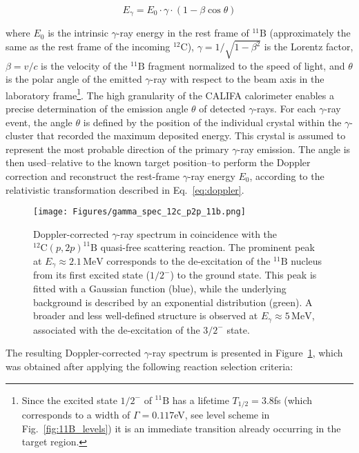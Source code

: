 \begin{equation}
    E_\gamma = E_0 \cdot \gamma \cdot (1 - \beta \cos \theta)
	\label{eq:doppler}
\end{equation}

where $E_0$ is the intrinsic $\gamma$-ray energy in the rest frame of $^{11}\mathrm{B}$ (approximately the same as the rest frame of the incoming $^{12}\mathrm{C}$), $\gamma = 1/\sqrt{1 - \beta^2}$ is the Lorentz factor, $\beta = v/c$ is the velocity of the $^{11}\mathrm{B}$ fragment normalized to the speed of light, and $\theta$ is the polar angle of the emitted $\gamma$-ray with respect to the beam axis in the laboratory frame\footnote{Since the excited state $1/2^-$ of $^{11}\mathrm{B}$ has a lifetime $T_{1/2} = 3.8$fs (which corresponds to a width of $\Gamma = 0.117$eV, see level scheme in Fig.~\ref{fig:11B_levels}) it is an immediate transition already occurring in the target region.}.\newline
The high granularity of the CALIFA calorimeter enables a precise determination of the emission angle $\theta$ of detected $\gamma$-rays. For each $\gamma$-ray event, the angle $\theta$ is defined by the position of the individual crystal within the $\gamma$-cluster that recorded the maximum deposited energy. This crystal is assumed to represent the most probable direction of the primary $\gamma$-ray emission. The angle is then used--relative to the known target position--to perform the Doppler correction and reconstruct the rest-frame $\gamma$-ray energy $E_0$, according to the relativistic transformation described in Eq.~\eqref{eq:doppler}.
\begin{figure}[htpb]
    \centering
    \texttt{[image: Figures/gamma\_spec\_12c\_p2p\_11b.png]}
    \caption{
Doppler-corrected $\gamma$-ray spectrum in coincidence with the $^{12}\mathrm{C}(p,2p)^{11}\mathrm{B}$ quasi-free scattering reaction. The prominent peak at $E_{\gamma} \approx 2.1\,\mathrm{MeV}$ corresponds to the de-excitation of the $^{11}\mathrm{B}$ nucleus from its first excited state ($1/2^-$) to the ground state. This peak is fitted with a Gaussian function (blue), while the underlying background is described by an exponential distribution (green). A broader and less well-defined structure is observed at $E_{\gamma} \approx 5\,\mathrm{MeV}$, associated with the de-excitation of the $3/2^-$ state.
    }
    \label{fig:gamma_spec_12c_p2p_11b}
\end{figure}
The resulting Doppler-corrected $\gamma$-ray spectrum is presented in Figure~\ref{fig:gamma_spec_12c_p2p_11b}, which was obtained after applying the following reaction selection criteria:
